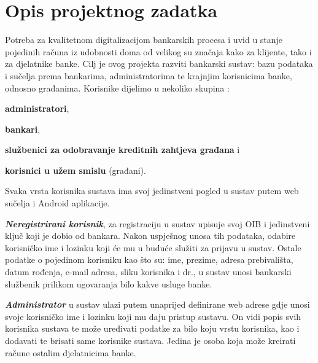 \chapter{Opis projektnog zadatka}
		
		Potreba za kvalitetnom digitalizacijom bankarskih procesa i uvid u stanje pojedinih računa iz udobnosti doma od velikog su značaja kako za klijente, tako i za djelatnike banke. Cilj je ovog projekta razviti bankarski sustav: bazu podataka i sučelja prema bankarima, administratorima te krajnjim korisnicima banke, odnosno građanima.
		Korisnike dijelimo u nekoliko skupina : 
		\begin{packed_item}
			\item \textbf{administratori}, 
			\item \textbf{bankari},
			\item \textbf{službenici za odobravanje kreditnih zahtjeva građana} i 
			\item \textbf{korisnici u užem smislu} (građani).
		\end{packed_item}
		
		Svaka vrsta korisnika sustava ima svoj jedinstveni pogled u sustav putem web sučelja i Android aplikacije.
		
		\textit{\textbf{Neregistrirani korisnik}}, za registraciju u sustav upisuje svoj OIB i jedinstveni ključ koji je dobio od bankara. Nakon uspješnog unosa tih podataka, odabire korisničko ime i lozinku koji će mu u buduće služiti za prijavu u sustav. Ostale podatke o pojedinom korisniku kao što su: ime, prezime, adresa prebivališta, datum rođenja, e-mail adresa, sliku korisnika i dr., u sustav unosi bankarski službenik prilikom ugovaranja bilo kakve usluge banke.
		
		\textit{\textbf{Administrator}} u sustav ulazi putem unaprijed definirane web adrese gdje unosi svoje korisničko ime i lozinku koji mu daju pristup sustavu. On vidi popis svih korisnika sustava te može uređivati podatke za bilo koju vrstu korisnika, kao i dodavati te brisati same korisnike sustava. Jedina je osoba koja može kreirati račune ostalim djelatnicima banke.
		
